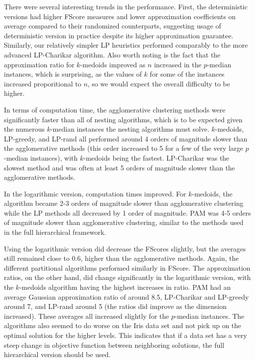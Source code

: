 \documentclass[conference, 10pt, final]{IEEEtran}
\begin{document}
There were several interesting trends in the performance. First, the deterministic versions had higher FScore measures and lower approximation coefficients on average compared to their randomized counterparts, suggesting usage of deterministic version in practice despite its higher approximation guarantee. Similarly, our relatively simpler LP heuristics performed comparably to the more advanced LP-Charikar algorithm. Also worth noting is the fact that the approximation ratio for $k$-medoids improved as $n$ increased in the $p$-median instances, which is surprising, as the values of $k$ for some of the instances increased proporitional to $n$, so we would expect the overall difficulty to be higher. 

In terms of computation time, the agglomerative clustering methods were significantly faster than all of nesting algorithms, which is to be expected given the numerous $k$-median instances the nesting algorithms must solve. $k$-medoids, LP-greedy, and LP-rand all performed around 4 orders of magnitude slower than the agglomerative methods (this order increased to 5 for a few of the very large $p$-median instances), with $k$-medoids being the fastest. LP-Charikar was the slowest method and was often at least 5 orders of magnitude slower than the agglomerative methods. 

In the logarithmic version, computation times improved. For $k$-medoids, the algorithm became 2-3 orders of magnitude slower than agglomerative clustering while the LP methods all decreased by 1 order of magnitude. PAM was 4-5 orders of magnitude slower than agglomerative clustering, similar to the methods used in the full hierarchical framework. 

Using the logarithmic version did decrease the FScores slightly, but the averages still remained close to 0.6, higher than the agglomerative methods. Again, the different partitional algorithms performed similarly in FScore. The approximation ratios, on the other hand, did change significantly in the logarithmic version, with the $k$-medoids algorithm having the highest increases in ratio. PAM had an average Gaussian approximation ratio of around 8.5, LP-Charikar and LP-greedy around 7, and LP-rand around 5 (the ratios did improve as the dimension increased). These averages all increased slightly for the $p$-median instances. The algorithms also seemed to do worse on the Iris data set and not pick up on the optimal solution for the higher levels. This indicates that if a data set has a very steep change in objective function between neighboring solutions, the full hierarchical version should be used. 
\end{document}
